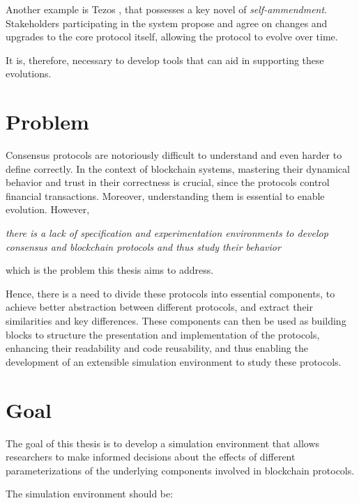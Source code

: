 Another example is Tezos \cite{tezos}, that possesses a key novel of \textit{self-ammendment}. Stakeholders participating in the system propose and agree on changes and upgrades to the core protocol itself, allowing the protocol to evolve over time. 

It is, therefore, necessary to develop tools that can aid in supporting these evolutions.




\section{Problem}

Consensus protocols are notoriously difficult to understand and even harder to define correctly. In the context of blockchain systems, mastering their dynamical behavior and trust in their correctness is crucial, since the protocols control financial transactions. Moreover, understanding them is essential to enable evolution. However,

\begin{center}
  \emph{there is a lack of specification and experimentation environments to develop consensus and blockchain protocols and thus study their behavior}
\end{center}

\noindent which is the problem this thesis aims to address.

Hence, there is a need to divide these protocols into essential components, to achieve better abstraction between different protocols, and extract their similarities and key differences. These components can then be used as building blocks to structure the presentation and implementation of the protocols, enhancing their readability and code reusability, and thus enabling the development of an extensible simulation environment to study these protocols.

\section{Goal}

The goal of this thesis is to develop a simulation environment that allows researchers to make informed decisions about the effects of different parameterizations of the underlying components involved in blockchain protocols.

The simulation environment should be:

